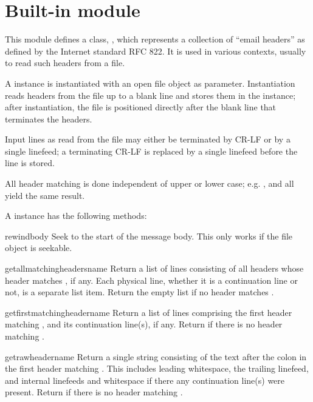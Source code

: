 \section{Built-in module }

This module defines a class, , which represents a
collection of ``email headers'' as defined by the Internet standard
RFC 822.  It is used in various contexts, usually to read such headers
from a file.

A  instance is instantiated with an open file object as
parameter.  Instantiation reads headers from the file up to a blank
line and stores them in the instance; after instantiation, the file is
positioned directly after the blank line that terminates the headers.

Input lines as read from the file may either be terminated by CR-LF or
by a single linefeed; a terminating CR-LF is replaced by a single
linefeed before the line is stored.

All header matching is done independent of upper or lower case;
e.g. ,  and  all yield
the same result.

A  instance has the following methods:

\begin{funcdesc}{rewindbody}{}
Seek to the start of the message body.  This only works if the file
object is seekable.
\end{funcdesc}

\begin{funcdesc}{getallmatchingheaders}{name}
Return a list of lines consisting of all headers whose header matches
, if any.  Each physical line, whether it is a continuation
line or not, is a separate list item.  Return the empty list if no
header matches .
\end{funcdesc}

\begin{funcdesc}{getfirstmatchingheader}{name}
Return a list of lines comprising the first header matching
, and its continuation line(s), if any.  Return 
if there is no header matching .
\end{funcdesc}

\begin{funcdesc}{getrawheader}{name}
Return a single string consisting of the text after the colon in the
first header matching .  This includes leading whitespace,
the trailing linefeed, and internal linefeeds and whitespace if there
any continuation line(s) were present.  Return  if there is
no header matching .
\end{funcdesc}

